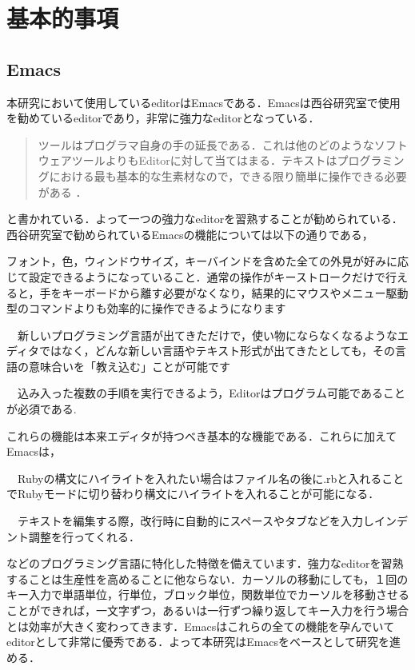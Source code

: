 \chapter{基本的事項}\label{ux57faux672cux7684ux4e8bux9805}

    \section{Emacs}\label{emacs}

    本研究において使用しているeditorはEmacsである．Emacsは西谷研究室で使用を勧めているeditorであり，非常に強力なeditorとなっている．
\begin{quotation}
ツールはプログラマ自身の手の延長である．これは他のどのようなソフトウェアツールよりもEditorに対して当てはまる．テキストはプログラミングにおける最も基本的な生素材なので，できる限り簡単に操作できる必要がある \cite{達人プログラマー}． 
\end{quotation}
と書かれている．よって一つの強力なeditorを習熟することが勧められている．西谷研究室で勧められているEmacsの機能については以下の通りである，

\begin{description}
\def\labelenumi{\arabic{enumi}.}
\tightlist
\item[設定可能である] フォント，色，ウィンドウサイズ，キーバインドを含めた全ての外見が好みに応じて設定できるようになっていること．通常の操作がキーストロークだけで行えると，手をキーボードから離す必要がなくなり，結果的にマウスやメニュー駆動型のコマンドよりも効率的に操作できるようになります
\item[拡張性がある]　新しいプログラミング言語が出てきただけで，使い物にならなくなるようなエディタではなく，どんな新しい言語やテキスト形式が出てきたとしても，その言語の意味合いを「教え込む」ことが可能です
\item[プログラム可能であること]　込み入った複数の手順を実行できるよう，Editorはプログラム可能であることが必須である.
\end{description}
これらの機能は本来エディタが持つべき基本的な機能である．これらに加えてEmacsは，

\begin{description}
\def\labelenumi{\arabic{enumi}.}
\tightlist
\item[構文のハイライト]　Rubyの構文にハイライトを入れたい場合はファイル名の後に.rbと入れることでRubyモードに切り替わり構文にハイライトを入れることが可能になる．
\item[自動インデント]　テキストを編集する際，改行時に自動的にスペースやタブなどを入力しインデント調整を行ってくれる．
\end{description}などのプログラミング言語に特化した特徴を備えています．強力なeditorを習熟することは生産性を高めることに他ならない．カーソルの移動にしても，１回のキー入力で単語単位，行単位，ブロック単位，関数単位でカーソルを移動させることができれば，一文字ずつ，あるいは一行ずつ繰り返してキー入力を行う場合とは効率が大きく変わってきます．Emacsはこれらの全ての機能を孕んでいてeditorとして非常に優秀である．よって本研究はEmacsをベースとして研究を進める．

